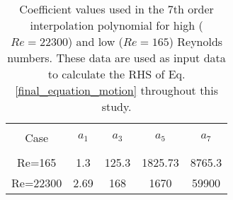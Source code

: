 \begin{table}[ht]

\begin{center}
\setlength{\unitlength}{\textwidth}

\begin{tabular}{c c c c c} %
\hline\hline %
\\[0.2ex]
Case & $a_1$ & $a_3$ & $a_5$ & $a_7$ \\ [0.8ex] %
\hline 
\\[0.8ex]%
Re=165 & 1.3 & 125.3 & 1825.73 & 8765.3 \\[0.8ex] %
Re=22300 & 2.69 & 168 & 1670 & 59900 \\ [1ex] %
\hline %
\end{tabular}

\caption{Coefficient values used in the 7th order interpolation polynomial for high ($Re=22300$) and low ($Re=165$) Reynolds numbers. These data are used as input data to calculate the RHS of Eq.\ref{final_equation_motion} throughout this study.}
 
\label{table:cy-coefficients} %
\end{center}
\end{table}

